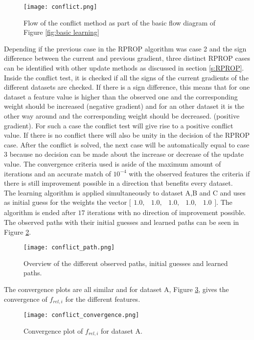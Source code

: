   \begin{figure}[h!]
 	\centering
 	\texttt{[image: conflict.png]}
 	\caption{Flow of the conflict method as part of the basic flow diagram of Figure \ref{fig:basic learning}}
 	\label{fig:conflict}
 \end{figure}

Depending if the previous case in the RPROP algorithm was case 2 and the sign difference between the current and previous gradient, three distinct RPROP cases can be identified with other update methods as discussed in section \ref{s:RPROP}. Inside the conflict test, it is checked if all the signs of the current gradients of the different datasets are checked. If there is a sign difference, this means that for one dataset a feature value is higher than the observed one and the corresponding weight should be increased (negative gradient) and for an other dataset it is the other way around and the corresponding weight should be decreased. (positive gradient). For such a case the conflict test will give rise to a positive conflict value. If there is no conflict there will also be unity in the decision of the RPROP case. After the conflict is solved, the next case will be automatically equal to case 3 because no decision can be made about the increase or decrease of the update value. The convergence criteria used is aside of the maximum amount of iterations and an accurate match of $10^{-4}$ with the observed features the criteria if there is still improvement possible in a direction that benefits every dataset.\\

The learning algorithm is applied simultaneously to dataset A,B and C and uses as initial guess for the weights the vector $\bigl[ \begin{smallmatrix} 1.0,&1.0,&1.0,&1.0,&1.0\end{smallmatrix}\bigr]$. The algorithm is ended after $17$ iterations with no direction of improvement possible. The observed paths with their initial guesses and learned paths can be seen in Figure \ref{fig:conflict_paths}.

 
 \begin{figure}[h!]
 	\centering
 	\texttt{[image: conflict\_path.png]}
 	\caption{Overview of the different observed paths, initial guesses and learned paths.}
 	\label{fig:conflict_paths}
 \end{figure}

The convergence plots are all similar and for dataset A, Figure \ref{fig:conflict_convergence}, gives the convergence of $f_{rel,i}$ for the different features. 
 \begin{figure}[h!]
	\centering
	\texttt{[image: conflict\_convergence.png]}
	\caption{Convergence plot of $f_{rel,i}$ for dataset A.}
	\label{fig:conflict_convergence}
\end{figure}
 
